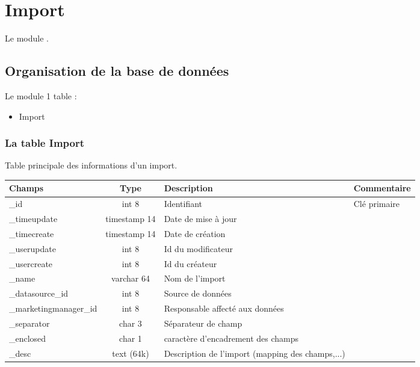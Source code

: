 

\clearpage
\section{Import}

Le module  \obm.

\subsection{Organisation de la base de données}

Le module  1 table :
\begin{itemize}
 \item Import
\end{itemize}

\subsubsection{La table Import}
Table principale des informations d'un import.\\

\begin{tabular}{|p{3cm}|c|p{5.4cm}|p{2.6cm}|}
\hline
\textbf{Champs} & \textbf{Type} & \textbf{Description} & \textbf{Commentaire} \\
\hline
\_id & int 8 & Identifiant & Clé primaire \\
\hline
\_timeupdate & timestamp 14 & Date de mise à jour & \\
\hline
\_timecreate & timestamp 14 & Date de création & \\
\hline
\_userupdate & int 8 & Id du modificateur & \\
\hline
\_usercreate & int 8 & Id du créateur & \\
\hline
\_name & varchar 64 & Nom de l'import & \\
\hline
\_datasource\_id & int 8 & Source de données & \\
\hline
\_marketingmanager\_id & int 8 & Responsable affecté aux données & \\
\hline
\_separator & char 3 & Séparateur de champ & \\
\hline
\_enclosed & char 1 & caractère d'encadrement des champs & \\
\hline
\_desc & text (64k) & Description de l'import (mapping des champs,...) &\\
\hline
\end{tabular}


